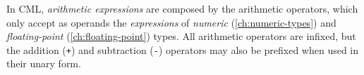In CML, \emph{arithmetic expressions} are composed by the arithmetic operators,
which only accept as operands
the \emph{expressions} of \emph{numeric} (\ref{ch:numeric-types})
and \emph{floating-point} (\ref{ch:floating-point}) types.
All arithmetic operators are infixed,
but the addition (\verb|+|) and subtraction (\verb|-|) operators may also be prefixed when used in their unary form.
